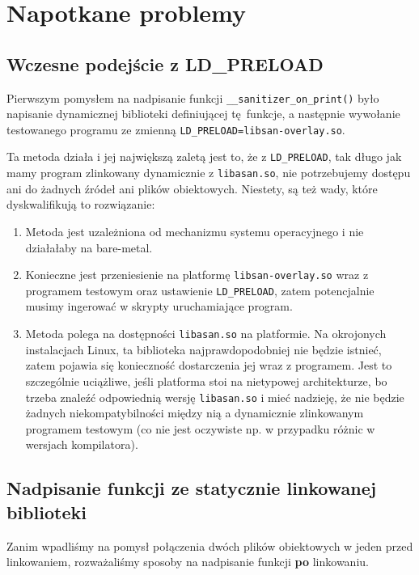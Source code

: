 \documentclass[../main.tex]{subfiles}
\begin{document}
\section{Napotkane problemy}
\subsection{Wczesne podejście z LD\_PRELOAD}
Pierwszym pomysłem na nadpisanie funkcji \texttt{__sanitizer_on_print()}
było napisanie dynamicznej biblioteki definiującej tę funkcje, a następnie
wywołanie testowanego programu ze zmienną
\texttt{LD_PRELOAD=libsan-overlay.so}.

Ta metoda działa i jej największą zaletą jest to, że z
\texttt{LD_PRELOAD}, tak długo jak mamy program zlinkowany dynamicznie
z \texttt{libasan.so}, nie potrzebujemy dostępu ani do żadnych źródeł
ani plików obiektowych. Niestety, są też wady, które dyskwalifikują to
rozwiązanie:

\begin{enumerate}
	\item Metoda jest uzależniona od mechanizmu systemu operacyjnego i nie
		działałaby na bare-metal.
	\item Konieczne jest przeniesienie na platformę
		\texttt{libsan-overlay.so} wraz z programem testowym oraz
		ustawienie \texttt{LD_PRELOAD}, zatem potencjalnie musimy
		ingerować w skrypty uruchamiające program.
	\item Metoda polega na dostępności \texttt{libasan.so} na
		platformie. Na okrojonych instalacjach Linux, ta biblioteka
		najprawdopodobniej nie będzie istnieć, zatem pojawia się konieczność
		dostarczenia jej wraz z programem. Jest to szczególnie uciążliwe, jeśli
		platforma stoi na nietypowej architekturze, bo trzeba znaleźć
		odpowiednią wersję \texttt{libasan.so} i mieć nadzieję, że nie
		będzie żadnych niekompatybilności między nią a dynamicznie zlinkowanym
		programem testowym (co nie jest oczywiste np. w przypadku różnic w
		wersjach kompilatora).
\end{enumerate}

\subsection{Nadpisanie funkcji ze statycznie linkowanej biblioteki}
Zanim wpadliśmy na pomysł połączenia dwóch plików obiektowych w jeden przed
linkowaniem, rozważaliśmy sposoby na nadpisanie funkcji \textbf{po} linkowaniu.
\end{document}

